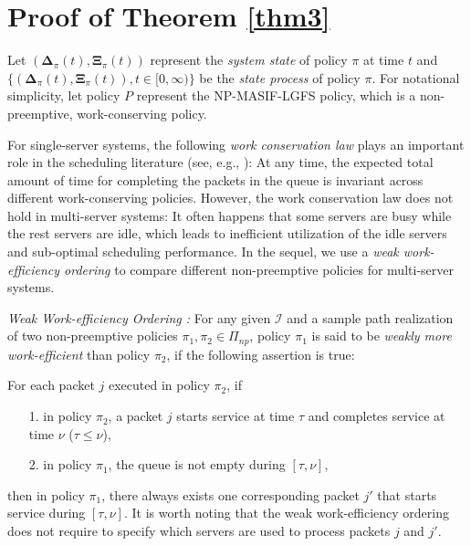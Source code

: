 \ifreport

\section{Proof of Theorem \ref{thm3}}\label{app2}

 
Let $(\bm\Delta_{\pi}(t),\bm\Xi_{\pi}(t))$ represent  the \emph{system state} of policy $\pi$ at time $t$ and $\{(\bm\Delta_{\pi}(t),\bm\Xi_{\pi}(t)),t\in [0,\infty)\}$ be the \emph{state process} of policy $\pi$. For notational simplicity, let policy $P$ represent the NP-MASIF-LGFS policy, which is a non-preemptive, work-conserving policy. 

For single-server  systems, the following \emph{work conservation law} 
plays an important role in the scheduling literature (see, e.g., \cite{Leonard_Kleinrock_book,Jose2010,Gittins:11}):
At any time, the expected total amount of time for completing the packets in the queue is invariant across different work-conserving policies. However, the work conservation law does not hold in multi-server  systems: It often happens that some servers are busy while the rest servers are idle, which leads to inefficient utilization of the idle servers and sub-optimal scheduling performance. 
In the sequel, we use a \emph{weak work-efficiency ordering} \cite{sun2016delay,sun2017delay} to compare different non-preemptive policies for multi-server systems. 



\begin{definition} \label{def_order} \emph{Weak Work-efficiency Ordering \cite{sun2016delay,sun2017delay}:}
For any given $\mathcal{I}$ and a sample path realization of two non-preemptive policies $\pi_1,\pi_2\in\Pi_{np}$, policy $\pi_1$ is said to be \emph{weakly more work-efficient} than policy $\pi_2$, if the following assertion is true:
{For each packet $j$ executed in policy $\pi_2$, if
\begin{itemize}
\item[1.] in policy $\pi_2$, a packet $j$ starts service at time $\tau$ and completes service at time $\nu$ ($\tau\leq \nu$), 
\item[2.] in policy $\pi_1$, the queue is not empty during $[\tau,\nu]$, 
\end{itemize}
then  in policy $\pi_1$, there always exists one corresponding packet $j'$ that starts service during $[\tau,\nu]$. It is worth noting that the weak work-efficiency ordering does not require to specify which servers are used to process packets $j$ and $j'$.} \end{definition}

